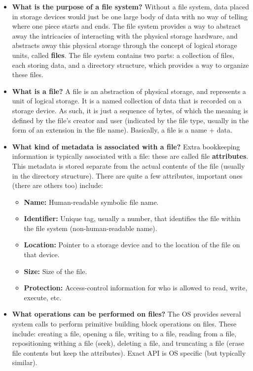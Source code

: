 \documentclass[12pt]{article}
\begin{document}
\begin{itemize}
    \item \textbf{What is the purpose of a file system?} Without a file system, data placed in storage devices would just be one large body of data with no way of telling where one piece starts and ends. The file system provides a way to abstract away the intricacies of interacting with the physical storage hardware, and abstracts away this physical storage through the concept of logical storage units, called \textbf{files}. The file system contains two parts: a collection of files, each storing data, and a directory structure, which provides a way to organize these files.
    \item \textbf{What is a file?} A file is an abstraction of physical storage, and represents a unit of logical storage. It is a named collection of data that is recorded on a storage device. As such, it is just a sequence of bytes, of which the meaning is defined by the file's creator and user (indicated by the file type, usually in the form of an extension in the file name). Basically, a file is a name + data.
    \item \textbf{What kind of metadata is associated with a file?} Extra bookkeeping information is typically associated with a file: these are called file \textbf{attributes}. This metadata is stored separate from the actual contents of the file (usually in the directory structure). There are quite a few attributes, important ones (there are others too) include:
        \begin{itemize}
            \item \textbf{Name:} Human-readable symbolic file name.
            \item \textbf{Identifier:} Unique tag, usually a number, that identifies the file within the file system (non-human-readable name).
            \item \textbf{Location:} Pointer to a storage device and to the location of the file on that device.
            \item \textbf{Size:} Size of the file.
            \item \textbf{Protection:} Access-control information for who is allowed to read, write, execute, etc.
        \end{itemize}
    \item \textbf{What operations can be performed on files?} The OS provides several system calls to perform primitive building block operations on files. These include: creating a file, opening a file, writing to a file, reading from a file, repositioning withing a file (seek), deleting a file, and truncating a file (erase file contents but keep the attributes). Exact API is OS specific (but typically similar).

\end{itemize}
\end{document}
